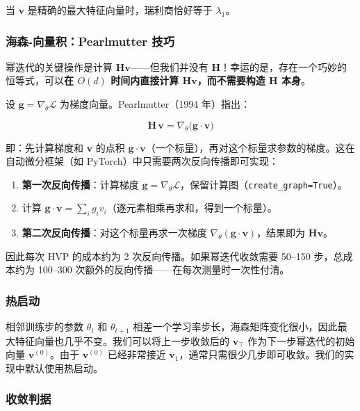 \documentclass[11pt,a4paper]{ctexart}
\newcommand{\vtopv}{\mathbf{v}_{\!\top}}
\newcommand{\Loss}{\mathcal{L}}
\newcommand{\Hmat}{\mathbf{H}}
\begin{document}
当 $\mathbf{v}$ 是精确的最大特征向量时，瑞利商恰好等于 $\lambda_1$。

\subsubsection*{海森-向量积：Pearlmutter 技巧}

幂迭代的关键操作是计算 $\Hmat\mathbf{v}$——但我们并没有 $\Hmat$！幸运的是，存在一个巧妙的恒等式，可以\textbf{在 $O(d)$ 时间内直接计算 $\Hmat\mathbf{v}$，而不需要构造 $\Hmat$ 本身}。

设 $\mathbf{g} = \nabla_\theta \Loss$ 为梯度向量。Pearlmutter（1994 年）指出：

\begin{equation}\label{eq:pearlmutter}
  \boxed{\Hmat\,\mathbf{v} = \nabla_\theta \bigl(\mathbf{g} \cdot \mathbf{v}\bigr)}
\end{equation}

即：先计算梯度和 $\mathbf{v}$ 的点积 $\mathbf{g}\cdot\mathbf{v}$（一个标量），再对这个标量求参数的梯度。这在自动微分框架（如 PyTorch）中只需要两次反向传播即可实现：

\begin{enumerate}[leftmargin=2em, itemsep=2pt]
  \item \textbf{第一次反向传播}：计算梯度 $\mathbf{g} = \nabla_\theta \Loss$，保留计算图（\texttt{create\_graph=True}）。
  \item 计算 $\mathbf{g} \cdot \mathbf{v} = \sum_i g_i v_i$（逐元素相乘再求和，得到一个标量）。
  \item \textbf{第二次反向传播}：对这个标量再求一次梯度 $\nabla_\theta(\mathbf{g}\cdot\mathbf{v})$，结果即为 $\Hmat\mathbf{v}$。
\end{enumerate}

因此每次 HVP 的成本约为 2 次反向传播。如果幂迭代收敛需要 50--150 步，总成本约为 100--300 次额外的反向传播——在每次测量时一次性付清。

\subsubsection*{热启动}

相邻训练步的参数 $\theta_t$ 和 $\theta_{t+1}$ 相差一个学习率步长，海森矩阵变化很小，因此最大特征向量也几乎不变。我们可以将上一步收敛后的 $\vtopv$ 作为下一步幂迭代的初始向量 $\mathbf{v}^{(0)}$。由于 $\mathbf{v}^{(0)}$ 已经非常接近 $\mathbf{v}_1$，通常只需很少几步即可收敛。我们的实现中默认使用热启动。

\subsubsection*{收敛判据}
\end{document}
